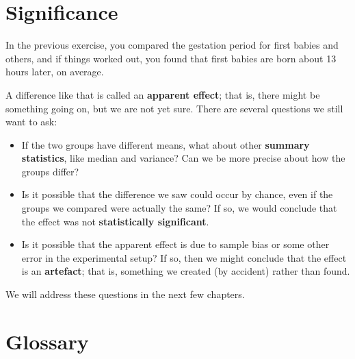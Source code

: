\documentclass[10pt]{book}
\begin{document}
\section{Significance}

In the previous exercise, you compared the gestation
period for first babies and others, and if things worked out,
you found that first babies are born about 13 hours later,
on average.

A difference like that is called an {\bf apparent effect};
that is, there might be something going on, but we are not
yet sure.  There are several questions we still want to ask:

\begin{itemize}

\item If the two groups have different means, what about other {\bf
  summary statistics}, like median and variance?  Can we be more
  precise about how the groups differ?

\item Is it possible that the difference we saw could occur by chance,
  even if the groups we compared were actually the same?  If so,
  we would conclude that the effect was not {\bf statistically
    significant}.

\item Is it possible that the apparent effect is due to sample bias or
  some other error in the experimental setup?  If so, then we might
  conclude that the effect is an {\bf artefact}; that is, something we
  created (by accident) rather than found. 

\end{itemize}

We will address these questions in the next few chapters.

\section{Glossary}
\end{document}
